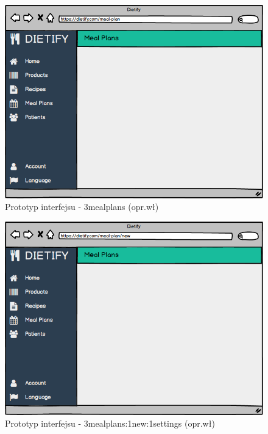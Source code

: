 \begin{minipage}{\textwidth}
    \begin{figure}[H]
        \centering\includegraphics[scale=0.55]{../mockup/3mealplans.png}
        \caption{Prototyp interfejsu - 3mealplans (opr.wł)}\label{rysunek:3mealplans}
    \end{figure}
\end{minipage}
\begin{minipage}{\textwidth}
    \begin{figure}[H]
        \centering\includegraphics[scale=0.55]{../mockup/3mealplans_1new_1settings.png}
        \caption{Prototyp interfejsu - 3mealplans:1new:1settings (opr.wł)}\label{rysunek:3mealplans_1new_1settings}
    \end{figure}
\end{minipage}
